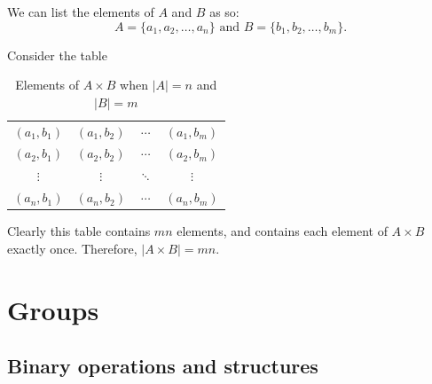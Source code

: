 \documentclass[10pt,]{book}
\theoremstyle{plain}
\theoremstyle{definition}
\theoremstyle{definition}
\theoremstyle{definition}
\theoremstyle{definition}
\numberwithin{equation}{section}
\begin{document}
\begin{exerciselist}
      We can list the elements of \(A\) and \(B\) as so:
\begin{equation*}

        A=\{a_1,a_2,\ldots, a_n\} \mbox{ and } B=\{b_1,b_2,\ldots, b_m\}.
      
\end{equation*}

\par

      Consider the table
\leavevmode%
\begin{table}
\centering
\begin{tabular}{cccc}
\((a_1,b_1)\)&\((a_1,b_2)\)&\(\cdots\)&\((a_1,b_m)\)\tabularnewline[0pt]
\((a_2,b_1)\)&\((a_2,b_2)\)&\(\cdots\)&\((a_2,b_m)\)\tabularnewline[0pt]
\(\vdots\)&\(\vdots\)&\(\ddots\)&\(\vdots\)\tabularnewline[0pt]
\((a_n,b_1)\)&\((a_n,b_2)\)&\(\cdots\)&\((a_n,b_m)\)
\end{tabular}
\caption{Elements of \(A\times B\) when \(|A|=n\) and \(|B|=m\)\label{cardmn}}
\end{table}
\par

      Clearly this table contains \(mn\) elements, and contains each element of \(A\times B\) exactly once. Therefore, \(|A\times B|=mn\).
\end{exerciselist}
\typeout{************************************************}
\typeout{************************************************}
\chapter[{Groups}]{Groups}\label{gps}
\typeout{************************************************}
\typeout{************************************************}
\section[{Binary operations and structures}]{Binary operations and structures}\label{section-4}
\end{document}
